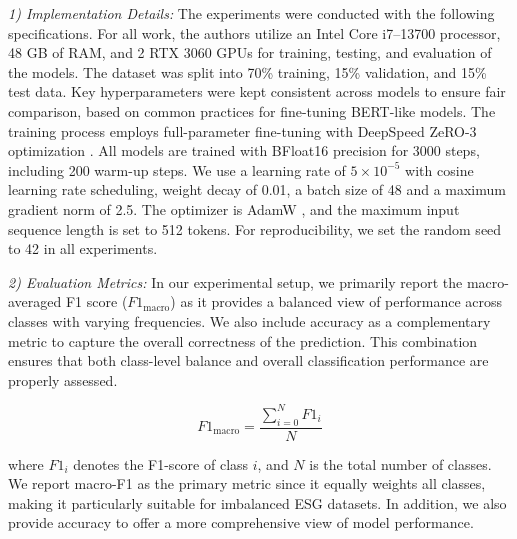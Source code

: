 \documentclass[12pt, letterpaper]{template}
\begin{document}
{{{{\textit{1) Implementation Details:} The experiments were conducted with the following specifications. For all work, the authors utilize an Intel Core i7–13700 processor, 48 GB of RAM, and 2 RTX 3060 GPUs for training, testing, and evaluation of the models. The dataset was split into 70\% training, 15\% validation, and 15\% test data. Key hyperparameters were kept consistent across models to ensure fair comparison, based on common practices for fine-tuning BERT-like models. The training process employs full-parameter fine-tuning with DeepSpeed ZeRO-3 optimization \citep{deepspeed-zero3}. All models are trained with BFloat16 precision for 3000 steps, including 200 warm-up steps. We use a learning rate of $5 \times 10^{-5}$ with cosine learning rate scheduling, weight decay of 0.01, a batch size of 48 and a maximum gradient norm of 2.5. The optimizer is AdamW \citep{adamw}, and the maximum input sequence length is set to 512 tokens. For reproducibility, we set the random seed to 42 in all experiments.}

\textit{2) Evaluation Metrics:} In our experimental setup, we primarily report the macro-averaged F1 score ($F1_{\text{macro}}$) as it provides a balanced view of performance across classes with varying frequencies. We also include accuracy as a complementary metric to capture the overall correctness of the prediction. This combination ensures that both class-level balance and overall classification performance are properly assessed.

\begin{equation}
F1_{\text{macro}} = \frac{\sum_{i=0}^{N} F1_i}{N}
\end{equation}

where $F1_i$ denotes the F1-score of class $i$, and $N$ is the total number of classes. We report macro-F1 as the primary metric since it equally weights all classes, making it particularly suitable for imbalanced ESG datasets. In addition, we also provide accuracy to offer a more comprehensive view of model performance.




}}}
\end{document}
